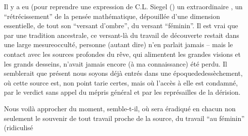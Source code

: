 Il y a eu (pour reprendre une expression de C.L. Siegel (\unsure{****}) un extraordinaire , un ``r\enspace é\enspace t\enspace r\enspace é\enspace c\enspace i\enspace s\enspace s\enspace e\enspace m\enspace e\enspace n\enspace t'' de la pensée mathématique, dépouillée d'une dimension essentielle, de tout son ``versant d'ombre'', du versant ``féminin''. Il est vrai que par une tradition ancestrale, ce versant-là du travail de découverte restait dans une large mesure\inserted{ }occulté, personne (autant dire) n'en p\enspace a\enspace r\enspace l\enspace a\enspace i\enspace t jamais -- mais le contact avec les sources profondes du rêve, qui alimentent les grandes visions et les grands desseins, n'avait jamais encore (à ma connaissance) été perdu. Il semblerait que présent nous soyons déjà entrés dans une é\enspace p\enspace o\enspace q\enspace u\enspace e\quad d\enspace e\quad d\enspace e\enspace s\enspace s\enspace è\enspace c\enspace h\enspace e\enspace m\enspace e\enspace n\enspace t, où cette source est, non point tarie certes, mais où l'accès à elle est condamné, par le verdict sans appel du mépris général et par les représailles de la dérision.

Nous voilà approcher du moment, semble-t-il, où sera éradiqué en chacun non seulement le s\enspace o\enspace u\enspace v\enspace e\enspace n\enspace i\enspace r de tout travail proche de la source, du travail ``au féminin'' (ridiculisé
